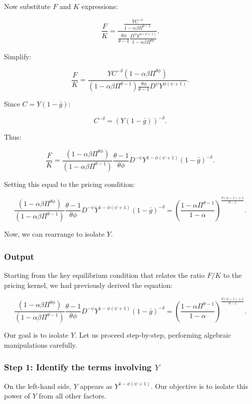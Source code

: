 \documentclass[12pt]{article}
\begin{document}
Now substitute $F$ and $K$ expressions:

\[
\frac{F}{K} = \frac{\frac{Y C^{-\delta}}{1-\alpha\beta\Pi^{\theta-1}}}{\frac{\theta\phi}{\theta-1}\frac{D^\psi Y^{\phi(\psi+1)}}{1-\alpha \beta\Pi^{\theta\phi}}}.
\]

Simplify:

\[
\frac{F}{K} = \frac{Y C^{-\delta}(1-\alpha\beta\Pi^{\theta\phi})}{(1-\alpha\beta\Pi^{\theta-1})\frac{\theta\phi}{\theta-1}D^\psi Y^{\phi(\psi+1)}}.
\]

Since $C=Y(1-\bar{g})$:

\[
C^{-\delta} = (Y(1-\bar{g}))^{-\delta}.
\]

Thus:

\[
\frac{F}{K} = \frac{(1-\alpha\beta\Pi^{\theta\phi})}{(1-\alpha\beta\Pi^{\theta-1})}\frac{\theta-1}{\theta\phi}D^{-\psi}Y^{1-\phi(\psi+1)}(1-\bar{g})^{-\delta}.
\]

Setting this equal to the pricing condition:

\[
\frac{(1-\alpha\beta\Pi^{\theta\phi})}{(1-\alpha\beta\Pi^{\theta-1})}\frac{\theta-1}{\theta\phi}D^{-\psi}Y^{1-\phi(\psi+1)}(1-\bar{g})^{-\delta} = \left(\frac{1-\alpha\Pi^{\theta-1}}{1-\alpha}\right)^{\frac{\theta(\phi-1)+1}{\theta-1}}.
\]

Now, we can rearrange to isolate $Y$.


\subsubsection{Output}

Starting from the key equilibrium condition that relates the ratio $F/K$ to the pricing kernel, we had previously derived the equation:

\[
\frac{(1-\alpha\beta\Pi^{\theta\phi})}{(1-\alpha\beta\Pi^{\theta-1})}\frac{\theta-1}{\theta\phi}D^{-\psi}Y^{1-\phi(\psi+1)}(1-\bar{g})^{-\delta} = \left(\frac{1-\alpha\Pi^{\theta-1}}{1-\alpha}\right)^{\frac{\theta(\phi-1)+1}{\theta-1}}.
\]

Our goal is to isolate $Y$. Let us proceed step-by-step, performing algebraic manipulations carefully.


\subsubsection{Step 1: Identify the terms involving $Y$}

On the left-hand side, $Y$ appears as $Y^{1-\phi(\psi+1)}$. Our objective is to isolate this power of $Y$ from all other factors.
\end{document}
